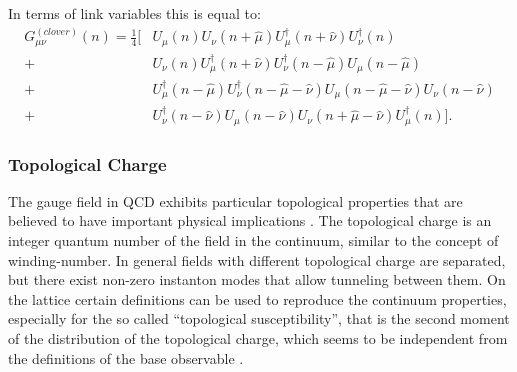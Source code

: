 In terms of link variables this is equal to:
\begin{align}
    G_{\mu\nu}^{(clover)}(n)=\frac{1}{4}\bigg[  &U_\mu(n)U_\nu(n+\hat\mu)U^\dagger_\mu(n+\hat\nu)U^\dagger_\nu(n)\\\nonumber
    + &U_\nu(n)U^\dagger_\mu(n+\hat\nu)U^\dagger_\nu(n-\hat\mu)U_\mu(n-\hat\mu)\\\nonumber
    + &U^\dagger_\mu(n-\hat\mu)U^\dagger_\nu(n-\hat\mu-\hat\nu)U_\mu(n-\hat\mu-\hat\nu)U_\nu(n-\hat\nu)\\\nonumber
    + &U^\dagger_\nu(n-\hat\nu)U_\mu(n-\hat\nu)U_\nu(n+\hat\mu-\hat\nu)U^\dagger_\mu(n) \bigg].
\end{align}
 

\subsubsection{Topological Charge}
The gauge field in QCD exhibits particular topological properties that are believed to have important physical implications \cite{witten_current_1979,di_giacomo_topology_1997}. The topological charge is an integer quantum number of the field in the continuum, similar to the concept of winding-number. In general fields with different topological charge are separated, but there exist non-zero instanton modes \cite{schafer_instantons_1998} that allow tunneling between them.
On the lattice certain definitions can be used to reproduce the continuum properties, especially for the so called ``topological susceptibility'', that is the second moment of the distribution of the topological charge, which seems to be independent from the definitions of the base observable \cite{alexandrou_comparison_2017,gross_qcd_1981}. 



